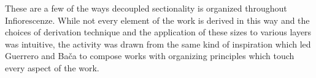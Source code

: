 
These are a few of the ways decoupled sectionality is organized throughout Infiorescenze. While not every element of the work is derived in this way and the choices of derivation technique and the application of these sizes to various layers was intuitive, the activity was drawn from the same kind of inspiration which led Guerrero and Bača to compose works with organizing principles which touch every aspect of the work.